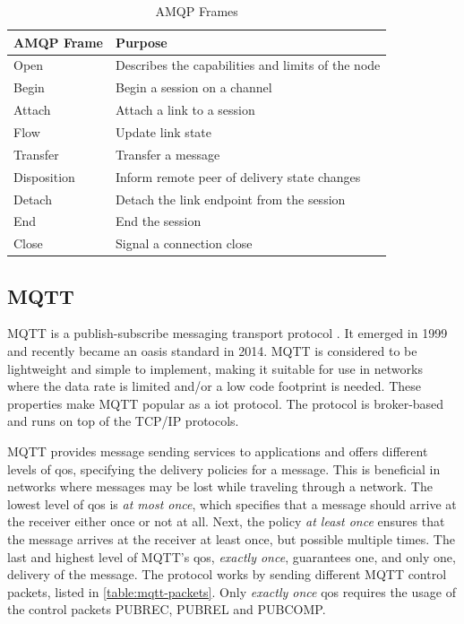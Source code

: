\begin{table}[h]
\begin{tabularx}{\textwidth}{| X | X |}
\hline
  \textbf{AMQP Frame} & \textbf{Purpose} \\ \hline
  Open & Describes the capabilities and limits of the node \\ \hline
  Begin & Begin a session on a channel \\ \hline
  Attach & Attach a link to a session \\ \hline
  Flow & Update link state \\ \hline
  Transfer & Transfer a message \\ \hline
  Disposition & Inform remote peer of delivery state changes \\ \hline
  Detach & Detach the link endpoint from the session \\ \hline
  End & End the session\\ \hline
  Close & Signal a connection close\\ \hline
\end{tabularx}
\caption{AMQP Frames}
\label{table-amqp-frames}
\end{table}

\subsection{MQTT}

MQTT is a publish-subscribe messaging transport protocol \cite{oasis-mqtt}. It
emerged in 1999 and recently became an \gls{oasis} standard in 2014. MQTT is
considered to be lightweight and simple to implement, making it suitable for
use in networks where the data rate is limited and/or a low code footprint is
needed. These properties make MQTT popular as a \gls{iot} protocol. The protocol
is broker-based and runs on top of the TCP/IP protocols.

MQTT provides message sending services to applications and offers different
levels of \gls{qos}, specifying the delivery policies for a message. This is
beneficial in networks where messages may be lost while traveling through a
network. The lowest level of \gls{qos} is \textit{at most once}, which specifies
that a message should arrive at the receiver either once or not at all. Next,
the policy \textit{at least once} ensures that the message arrives at the
receiver at least once, but possible multiple times. The last and highest level
of MQTT's \gls{qos}, \textit{exactly once}, guarantees one, and only one,
delivery of the message. The protocol works by sending different MQTT control
packets, listed in \cref{table:mqtt-packets}. Only \textit{exactly once}
\gls{qos} requires the usage of the control packets PUBREC, PUBREL and PUBCOMP.

